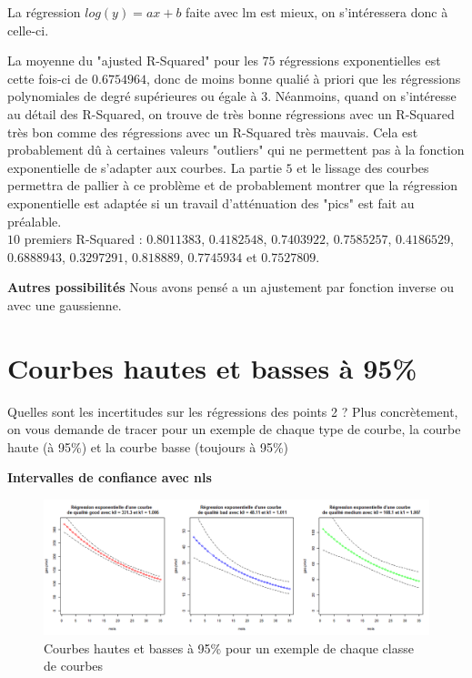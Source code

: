 \documentclass[12pt]{article}
\begin{document}
La r\'egression $log(y)=ax+b$ faite avec lm est mieux, on s'int\'eressera donc \`a celle-ci.
\newline 

La moyenne du "ajusted R-Squared" pour les $75$ r\'egressions exponentielles est cette fois-ci de $0.6754964$, donc de moins bonne quali\'e \`a priori que les r\'egressions polynomiales de degr\'e sup\'erieures ou \'egale \`a $3$. 
\newline
N\'eanmoins, quand on s'int\'eresse au d\'etail des R-Squared, on trouve de tr\`es bonne r\'egressions avec un R-Squared tr\`es bon comme des r\'egressions avec un R-Squared tr\`es mauvais. Cela est probablement d\^u à certaines valeurs "outliers" qui ne permettent pas \`a la fonction exponentielle de s'adapter aux courbes. 
\newline
La partie $5$ et le lissage des courbes permettra de pallier \`a ce probl\`eme et de probablement montrer que la r\'egression exponentielle est adapt\'ee si un travail d'att\'enuation des "pics" est fait au pr\'ealable.
\newline
~\\
$10$ premiers R-Squared : 
\newline
$0.8011383$, $0.4182548$, $0.7403922$, $0.7585257$, $0.4186529$, $0.6888943$, $0.3297291$, $0.818889$, $0.7745934$ et $0.7527809$.

\textbf{Autres possibilit\'es}
\newline
Nous avons pens\'e a un ajustement par fonction inverse ou avec une gaussienne.



\newpage

\section{Courbes hautes et basses \`a 95\%}

Quelles sont les incertitudes sur les r\'egressions des points 2 ? Plus concr\`etement, on
vous demande de tracer pour un exemple de chaque type de courbe, la courbe haute (\`a
95\%) et la courbe basse (toujours \`a 95\%)

\textbf{Intervalles de confiance avec nls}

\begin{figure}[H]
 \centering %
	\includegraphics[width=430px]{q3_predict_nls}
  \caption{\label{fig:q3_predict_nls} Courbes hautes et basses à 95\% pour un exemple de chaque classe de courbes}
\end{figure}
\end{document}
